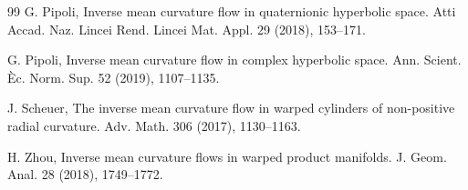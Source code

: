 \documentclass[12pt]{amsart}
\theoremstyle{plain}
\theoremstyle{definition}
\begin{document}
\begin{thebibliography}{99}
  G. Pipoli, Inverse mean curvature flow in quaternionic hyperbolic space. Atti Accad. Naz. Lincei Rend. Lincei Mat. Appl. 29 (2018), 153--171.

 G. Pipoli,  Inverse mean curvature flow in complex hyperbolic space. Ann. Scient. \`{E}c. Norm. Sup. 52 (2019),  1107--1135.

 J. Scheuer, The inverse mean curvature flow in warped cylinders of non-positive radial curvature. Adv. Math.   306 (2017), 1130--1163.




 
  H. Zhou,   Inverse mean curvature flows in warped product manifolds. J. Geom. Anal. 28 (2018), 1749--1772.



\end{thebibliography}
\
\end{document}
